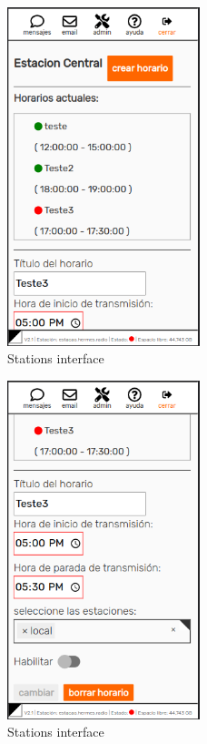 \documentclass[11pt,a4paper]{article}
\begin{document}
\begin{figure}[H]
    \centering
    \includegraphics[width=0.5\textwidth]{screenshots/frontend/es/central.png}
    \caption{Stations interface}
	\vspace{-10pt}
    \label{fig:central}
\end{figure} 

\begin{figure}[H]
    \centering
    \includegraphics[width=0.5\textwidth]{screenshots/frontend/es/central2.png}
    \caption{Stations interface}
	\vspace{-10pt}
    \label{fig:central2}
\end{figure} 
\end{document}
